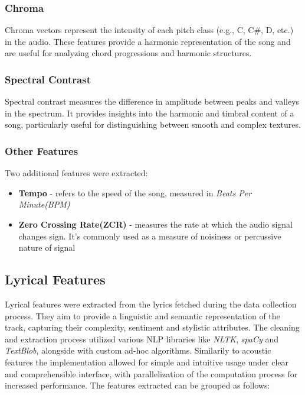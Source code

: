 \subsubsection*{Chroma}
Chroma vectors represent the intensity of each pitch class (e.g., C, C\#, D,
etc.) in the audio. These features provide a harmonic representation of the
song and are useful for analyzing chord progressions and harmonic structures.

\subsubsection*{Spectral Contrast}
Spectral contrast measures the difference in amplitude between peaks and
valleys in the spectrum. It provides insights into the harmonic and timbral
content of a song, particularly useful for distinguishing between smooth and
complex textures.

\subsubsection*{Other Features}
Two additional features were extracted:
\begin{itemize}
  \item \textbf{Tempo} - refers to the speed of the song, measured in \textit{Beats Per Minute(BPM)}
  \item \textbf{Zero Crossing Rate(ZCR)} - measures the rate at which the audio
    signal changes sign. It's commonly used as a measure of noisiness or
    percussive nature of signal
\end{itemize}


\subsection{Lyrical Features}
\label{sec:lyricalfeatures}

Lyrical features  were extracted from the lyrics fetched during the data
collection process. They aim to provide a linguistic and semantic
representation of the track, capturing their complexity, sentiment and
stylistic  attributes. The cleaning and extraction  process utilized various
NLP libraries like \textit{NLTK}, \textit{spaCy} and \textit{TextBlob},
alongside with custom ad-hoc algorithms. Similarily to acoustic features the
implementation allowed for simple and intuitive usage under clear and
comprehensible interface, with parallelization of the computation process for
increased performance. The features extracted can be grouped as follows:

